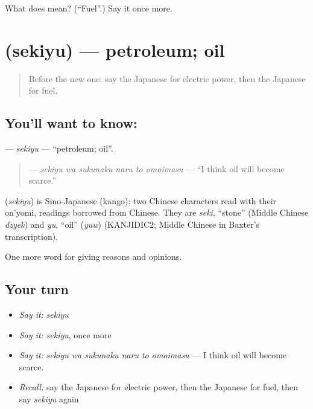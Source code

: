 \begin{tcolorbox}[breakable,colback=teal!4,colframe=teal!35!black,title={Before you move on}]
What does  mean? (\textquotedblleft{}Fuel\textquotedblright{}.) Say it once more.
\end{tcolorbox}
\section[\texorpdfstring{\ja{せきゆ} (sekiyu)}{せきゆ (sekiyu)}]{ (sekiyu) — petroleum; oil}

\label{lesson:JA-C337-sekiyu}



\begin{quote}
Before the new one: say the Japanese for electric power, then the Japanese for fuel.
\end{quote}

\subsection*{You'll want to know: }
\textbf{} — \emph{sekiyu} — \textquotedblleft{}petroleum; oil\textquotedblright{}.

\begin{quote}
\textbf{   } — \emph{sekiyu wa sukunaku naru to omoimasu} — \textquotedblleft{}I think oil will become scarce.\textquotedblright{}
\end{quote}

\begin{cousinweb}
\textbf{} (\emph{sekiyu}) is Sino-Japanese (kango): two Chinese characters read with their on'yomi, readings borrowed from Chinese. They are \emph{seki}, \textquotedblleft{}stone\textquotedblright{} (Middle Chinese \emph{dzyek}) and \emph{yu}, \textquotedblleft{}oil\textquotedblright{} (\emph{yuw}) (KANJIDIC2; Middle Chinese in Baxter's transcription).
\end{cousinweb}

\begin{grammarlens}[title={What you've built}]
One more word for giving reasons and opinions.
\end{grammarlens}

\subsection*{Your turn}
\begin{itemize}
\raggedright
  \item \emph{Say it:} \emph{sekiyu}
  \item \emph{Say it:} \emph{sekiyu}, once more
  \item \emph{Say it:} \emph{sekiyu wa sukunaku naru to omoimasu} — I think oil will become scarce.
  \item \emph{Recall:} say the Japanese for electric power, then the Japanese for fuel, then say \emph{sekiyu} again
\end{itemize}

